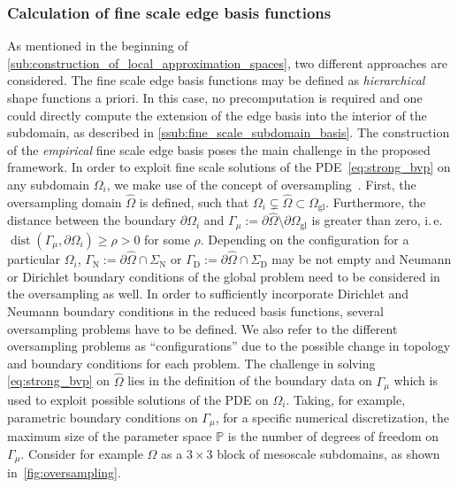 \documentclass[AMA,STIX1COL,doublespace]{WileyNJD-v2}
\DeclareMathOperator*{\dist}{dist}
\begin{document}
\subsubsection{Calculation of fine scale edge basis functions}%
\label{ssub:fine_scale_edge_basis}
As mentioned in the beginning of \cref{sub:construction_of_local_approximation_spaces}, two different approaches are considered. 
The fine scale edge basis functions may be defined as \textit{hierarchical} shape functions a priori. 
In this case, no precomputation is required and one could directly compute the extension of the edge basis into the interior of the subdomain, as described in 
\cref{ssub:fine_scale_subdomain_basis}.
The construction of the \textit{empirical} fine scale edge basis poses the main challenge in the proposed framework. 
In order to exploit fine scale solutions of the PDE~\cref{eq:strong_bvp} on any subdomain $\varOmega_i$, we make use of the concept of oversampling~\cite{HW1997}.
First, the oversampling domain $\hat{\varOmega}$ is defined, such that $\varOmega_{i}\subsetneq\hat{\varOmega}\subset\varOmega_{\mathrm{gl}}$.
Furthermore, the distance between the boundary $\partial\varOmega_{i}$ and $\varGamma_{\mu}:=\partial\hat{\varOmega}\setminus\partial\varOmega_{\mathrm{gl}}$ is greater than zero, i.\,e.\ $\dist(\varGamma_{\mu}, \partial\varOmega_{i})\ge\rho>0$ for some $\rho$.
Depending on the configuration for a particular $\varOmega_i$, $\varGamma_{\mathrm{N}}:=\partial\hat{\varOmega}\cap\varSigma_{\mathrm{N}}$ or $\varGamma_{\mathrm{D}}:=\partial\hat{\varOmega}\cap\varSigma_{\mathrm{D}}$ may be not empty and Neumann or Dirichlet boundary conditions of the global problem need to be considered in the oversampling as well.
In order to sufficiently incorporate Dirichlet and Neumann boundary conditions in the reduced basis functions, several oversampling problems have to be defined.
We also refer to the different oversampling problems as \enquote{configurations} due to the possible change in topology and boundary conditions for each problem.
The challenge in solving \cref{eq:strong_bvp} on $\hat{\varOmega}$ lies in the definition of the boundary data on $\varGamma_{\mu}$ which is used to exploit possible solutions of the PDE on $\varOmega_{i}$.
Taking, for example, parametric boundary conditions on $\varGamma_{\mu}$, for a specific numerical discretization, the maximum size of the parameter space $\mathbb{P}$ is the number of degrees of freedom on $\varGamma_{\mu}$.
Consider for example $\hat{\varOmega}$ as a $3\times 3$ block of mesoscale subdomains, as shown in~\cref{fig:oversampling}.
\end{document}

